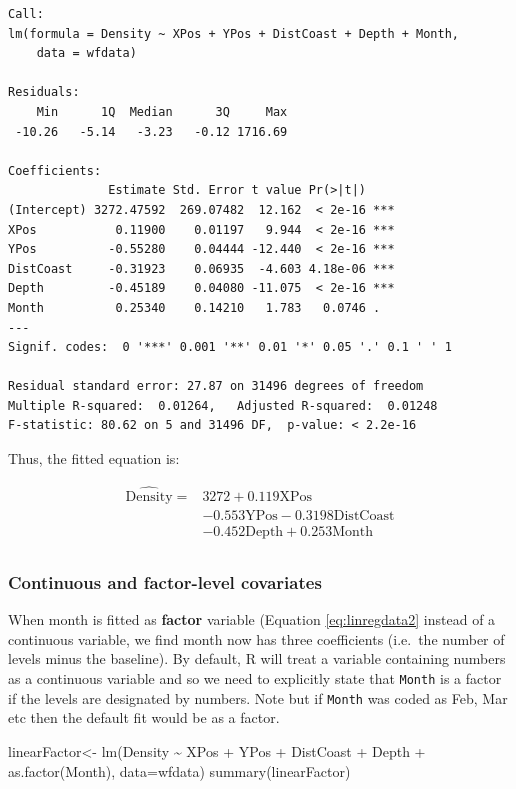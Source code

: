 \documentclass[
  oneside]{krantz}
\newenvironment{Shaded}{\begin{snugshade}}{\end{snugshade}}
\newcommand{\AttributeTok}[1]{\textcolor[rgb]{0.77,0.63,0.00}{#1}}
\newcommand{\FunctionTok}[1]{\textcolor[rgb]{0.00,0.00,0.00}{#1}}
\newcommand{\NormalTok}[1]{#1}
\newcommand{\OtherTok}[1]{\textcolor[rgb]{0.56,0.35,0.01}{#1}}
\newcommand{\SpecialCharTok}[1]{\textcolor[rgb]{0.00,0.00,0.00}{#1}}
\begin{document}
\begin{verbatim}
Call:
lm(formula = Density ~ XPos + YPos + DistCoast + Depth + Month, 
    data = wfdata)

Residuals:
    Min      1Q  Median      3Q     Max 
 -10.26   -5.14   -3.23   -0.12 1716.69 

Coefficients:
              Estimate Std. Error t value Pr(>|t|)    
(Intercept) 3272.47592  269.07482  12.162  < 2e-16 ***
XPos           0.11900    0.01197   9.944  < 2e-16 ***
YPos          -0.55280    0.04444 -12.440  < 2e-16 ***
DistCoast     -0.31923    0.06935  -4.603 4.18e-06 ***
Depth         -0.45189    0.04080 -11.075  < 2e-16 ***
Month          0.25340    0.14210   1.783   0.0746 .  
---
Signif. codes:  0 '***' 0.001 '**' 0.01 '*' 0.05 '.' 0.1 ' ' 1

Residual standard error: 27.87 on 31496 degrees of freedom
Multiple R-squared:  0.01264,   Adjusted R-squared:  0.01248 
F-statistic: 80.62 on 5 and 31496 DF,  p-value: < 2.2e-16
\end{verbatim}

\normalsize

Thus, the fitted equation is:

\begin{align}
\widehat{\textrm{Density}} = & 3272 + 0.119\textrm{XPos}\\
& - 0.553\textrm{YPos} - 0.3198\textrm{DistCoast} \\
& - 0.452 \textrm{Depth} + 0.253 \textrm{Month}\\
\end{align}

\hypertarget{continuous-and-factor-level-covariates}{%
\subsubsection{Continuous and factor-level covariates}\label{continuous-and-factor-level-covariates}}

When month is fitted as \textbf{factor} variable (Equation \eqref{eq:linregdata2} instead of a continuous variable, we find month now has three coefficients (i.e.~the number of levels minus the baseline). By default, R will treat a variable containing numbers as a continuous variable and so we need to explicitly state that \texttt{Month} is a factor if the levels are designated by numbers. Note but if \texttt{Month} was coded as Feb, Mar etc then the default fit would be as a factor.

\scriptsize

\begin{Shaded}
\begin{Highlighting}[]
\NormalTok{linearFactor}\OtherTok{\textless{}{-}} \FunctionTok{lm}\NormalTok{(Density }\SpecialCharTok{\textasciitilde{}}\NormalTok{ XPos }\SpecialCharTok{+}\NormalTok{ YPos }\SpecialCharTok{+}\NormalTok{ DistCoast }\SpecialCharTok{+}\NormalTok{ Depth }\SpecialCharTok{+} \FunctionTok{as.factor}\NormalTok{(Month), }\AttributeTok{data=}\NormalTok{wfdata)}
\FunctionTok{summary}\NormalTok{(linearFactor)}
\end{Highlighting}
\end{Shaded}
\end{document}

